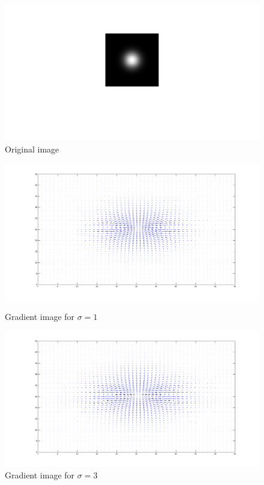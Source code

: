 \documentclass[a4paper,10pt]{article}
\begin{document}
\begin{figure}[ht]
\centering
\includegraphics[width=\textwidth]{quiver_original}
\caption{Original image}
\label{fig:quiver_original}
\end{figure}
\begin{figure}[ht]
\begin{minipage}[b]{0.45\linewidth}
\centering
\includegraphics[width=\textwidth]{quiver_sigma1}
\caption{Gradient image for $\sigma=1$}
\end{minipage}
\hspace{0.1cm}
\begin{minipage}[b]{0.45\linewidth}
\centering
\includegraphics[width=\textwidth]{quiver_sigma3}
\caption{Gradient image for $\sigma=3$}
\end{minipage}
\end{figure}
\end{document}

